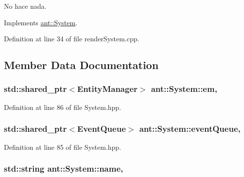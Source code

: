 No hace nada. 



Implements \hyperlink{classant_1_1_system_a4d97de105123df07d4d90ac2914f9e6c}{ant\+::\+System}.



Definition at line 34 of file render\+System.\+cpp.



\subsection{Member Data Documentation}
\hypertarget{classant_1_1_system_a5661d872ff769be150bd4e9a9552f6b9}{
\subsubsection[{em}]{\setlength{\rightskip}{0pt plus 5cm}std\+::shared\+\_\+ptr$<${\bf Entity\+Manager}$>$ ant\+::\+System\+::em\hspace{0.3cm}{\ttfamily [protected]}, {\ttfamily [inherited]}}}\label{classant_1_1_system_a5661d872ff769be150bd4e9a9552f6b9}


Definition at line 86 of file System.\+hpp.

\hypertarget{classant_1_1_system_a27e1814e13d161b5ef0e848e3da16d29}{
\subsubsection[{event\+Queue}]{\setlength{\rightskip}{0pt plus 5cm}std\+::shared\+\_\+ptr$<${\bf Event\+Queue}$>$ ant\+::\+System\+::event\+Queue\hspace{0.3cm}{\ttfamily [protected]}, {\ttfamily [inherited]}}}\label{classant_1_1_system_a27e1814e13d161b5ef0e848e3da16d29}


Definition at line 85 of file System.\+hpp.

\hypertarget{classant_1_1_system_a60b3c00a760a3b4947ab1f1fc534a5b2}{
\subsubsection[{name}]{\setlength{\rightskip}{0pt plus 5cm}std\+::string ant\+::\+System\+::name\hspace{0.3cm}{\ttfamily [protected]}, {\ttfamily [inherited]}}}\label{classant_1_1_system_a60b3c00a760a3b4947ab1f1fc534a5b2}


